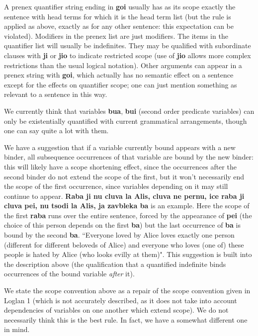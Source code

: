 \documentclass[12pt]{book}
\begin{document}
{A prenex quantifier string ending in {\bf goi} usually has as its scope exactly the sentence with head terms for which it is the head term list (but the rule is applied as above, exactly as for any other sentence:  this expectation can be violated).  Modifiers
in the prenex list are just modifiers.  The items in the quantifier list will usually be indefinites.  They may be qualified with subordinate clauses with
{\bf ji} or {\bf jio} to indicate restricted scope (use of {\bf jio} allows more complex restrictions than the usual logical notation).   Other arguments can appear in a prenex string with {\bf goi}, which actually has no semantic effect on
a sentence except for the effects on quantifier scope;  one can just mention something as relevant to a sentence in this way.

We currently think that variables {\bf bua}, {\bf bui} (second order predicate variables) can only be existentially quantified with current grammatical arrangements, though one can say quite a lot with them.

We have a suggestion that if a variable currently bound appears with a new binder, all subsequence occurrences of that variable are bound by the new binder:  this will likely have a scope shortening effect, since the occurrences after the second binder do not extend the scope of the first, but it won't necessarily end the scope of the first occurrence, since variables depending on it may still continue to appear.  {\bf Raba ji nu cluva la Alis, cluva ne pernu, ice raba ji cluva pei, nu tsodi la Alis, ja zavbleka ba} is an example.  Here the scope of the first {\bf raba} runs over the entire sentence, forced by the appearance of {\bf pei} (the choice of this person depends on the first {\bf ba}) but the last occurrence of {\bf ba} is bound by the second {\bf ba}.
``Everyone loved by Alice loves exactly one person (different for different beloveds of Alice) and everyone who loves (one of) these people is hated by Alice (who looks evilly at them)".  This suggestion is built into the description above (the qualification that a quantified indefinite binds occurrences of the bound variable {\em after} it).

We state the scope convention above as a repair of the scope convention given in Loglan 1 (which is not accurately described, as it does not take into account dependencies of variables on one another which extend scope).  We do not necessarily think this is the best rule.  In fact, we have a somewhat different one in mind.

}
\end{document}
